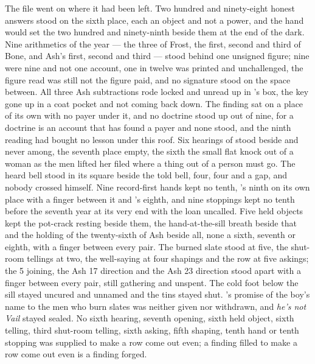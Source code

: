 The file went on where it had been left. Two hundred and ninety-eight honest answers stood on the sixth place, each an object and not a power, and the hand would set the two hundred and ninety-ninth beside them at the end of the dark. Nine arithmetics of the year --- the three of Frost, the first, second and third of Bone, and Ash's first, second and third --- stood behind one unsigned figure; nine were nine and not one account, one in twelve was printed and unchallenged, the figure read was still not the figure paid, and no signature stood on the space between. All three Ash subtractions rode locked and unread up  in 's box, the key gone up in a coat pocket and not coming back down. The finding sat on a place of its own with no payer under it, and no doctrine stood up out of nine, for a doctrine is an account that has found a payer and none stood, and the ninth reading had bought no lesson under this roof. Six hearings of  stood beside and never among, the seventh place empty, the sixth the small flat knock out of a woman as the men lifted her filed where a thing out of a person must go. The heard bell stood in its square beside the told bell, four, four and a gap, and nobody crossed himself. Nine record-first hands kept no tenth, 's ninth on its own place with a finger between it and 's eighth, and nine stoppings kept no tenth before the seventh year at its very end with the loan uncalled. Five held objects kept the pot-crack resting beside them, the hand-at-the-sill breath beside that and the holding of the twenty-sixth of Ash beside all, none a sixth, seventh or eighth, with a finger between every pair. The burned slate stood at five, the shut-room tellings at two, the well-saying at four shapings and the row at five askings; the  5 joining, the Ash 17 direction and the Ash 23 direction stood apart with a finger between every pair, still gathering and unspent. The cold foot below the sill stayed uncured and unnamed and the tins stayed shut. 's promise of the boy's name to the men who burn slates was neither given nor withdrawn, and \emph{he's not Vail} stayed sealed. No sixth hearing, seventh opening, sixth held object, sixth telling, third shut-room telling, sixth asking, fifth shaping, tenth hand or tenth stopping was supplied to make a row come out even; a finding filled to make a row come out even is a finding forged.

\scenebreak

